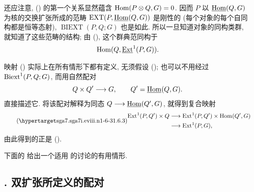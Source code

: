 还应注意, () 的第一个关系显然蕴含 $\operatorname{Hom}(P\otimes Q,G)=0$. 因而 $P$ 以 $\uHom(Q,G)$ 为核的交换扩张所成的范畴 $\operatorname{EXT}(P,\uHom(Q,G))$ 是刚性的 (每个对象的每个自同构都是恒等态射), $\operatorname{BIEXT}(P,Q;G)$ 也是如此. 所以一旦知道对象的同构类群, 就知道了这些范畴的结构; 由 (), 这个群典范同构于
\[
 \Hom(Q,\uExt^1(P,G)).
\]

映射 () 实际上在所有情形下都有定义, 无须假设 (); 也可以不用经过 $\operatorname{Biext}^1(P,Q;G)$, 而用自然配对
\[
 Q\times Q'\longrightarrow G,
\qquad Q'=\uHom(Q,G).
\]
直接描述它. 将该配对解释为同态 $Q\longrightarrow\uHom(Q',G)$, 就得到复合映射
\begin{equation}\tag{\SGARefTarget{sga7.sga7i.eviii.n1-6-3}{1.6.3}}
\begin{split}
 \Ext^1(P,Q')\times Q
 &\longrightarrow
 \Ext^1(P,Q')\times\Hom(Q',G)\\
 &\longrightarrow
 \Ext^1(P,G),
\end{split}
\end{equation}
由此得到的正是 ().

下面的  给出一个适用  的讨论的有用情形.



\subsection*{. 双扩张所定义的配对}

